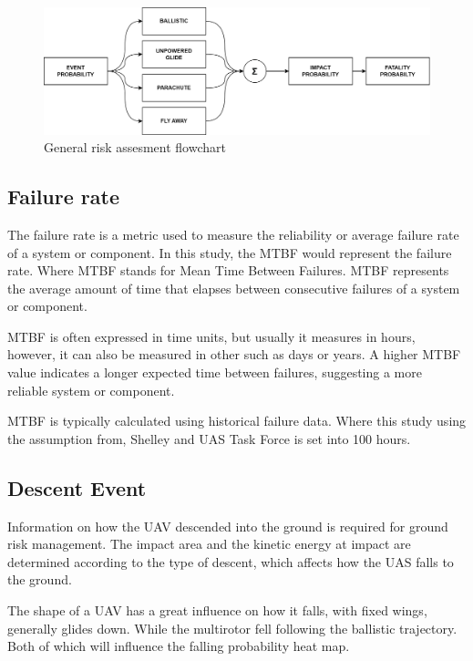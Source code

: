 \documentclass[12pt]{report}
\begin{document}
        \begin{figure}[H]
            \centering
            \includegraphics[width=\textwidth]{General Image/OSM Drone-LOGIC_SUM.png}
            \caption{General risk assesment flowchart}
        \end{figure}

        \subsection{Failure rate}
        The failure rate is a metric used to measure the reliability or average failure rate of a system or component.
        In this study, the MTBF would represent the failure rate. Where MTBF stands for Mean Time Between Failures. MTBF
        represents the average amount of time that elapses between consecutive failures of a system or component.
            
        MTBF is often expressed in time units, but usually it measures in hours, however, it can also be measured in
        other such as days or years. A higher MTBF value indicates a longer expected time between failures, suggesting a
        more reliable system or component.
            
        MTBF is typically calculated using historical failure data. Where this study using the assumption from, Shelley
        \cite{shelley_model_2016} and UAS Task Force \cite{noauthor_unmanned_2015} is set into 100 hours. 

        \subsection{Descent Event}\label{sec:descent_events} Information on how the UAV descended into the ground is
        required for ground risk management. The impact area and the kinetic energy at impact are determined according
        to the type of descent, which affects how the UAS falls to the ground. 
            
        The shape of a UAV has a great influence on how it falls, with fixed wings, generally glides down. While the
        multirotor fell following the ballistic trajectory. Both of which will influence the falling probability heat
        map. 
            
\end{document}
